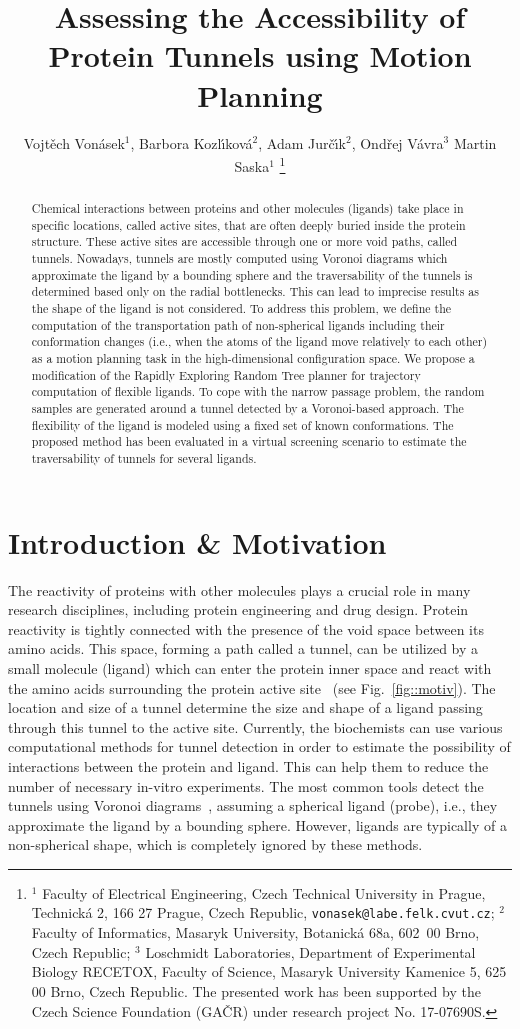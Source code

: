\documentclass[usletter, 10pt, conference]{ieeeconf} %
\title{Assessing the Accessibility of Protein Tunnels using Motion Planning}
\author{Vojt\v ech Von\' asek$^{1}$,
    Barbora Kozl\'\i kov\'a$^{2}$,
    Adam Jur\v{c}\'\i k$^{2}$,
    Ond\v{r}ej V\'{a}vra$^{3}$
    Martin Saska$^{1}$
\thanks{$^{1}$ Faculty of Electrical Engineering,  Czech Technical University in Prague, 
Technick\'a 2, 166 27 Prague, Czech Republic, {\tt vonasek@labe.felk.cvut.cz};
$^{2}$ Faculty of Informatics, Masaryk University, Botanick\'a 68a, 602~00 Brno, Czech Republic;
$^{3}$ Loschmidt Laboratories, Department of Experimental Biology RECETOX, Faculty of Science, Masaryk University
    Kamenice 5, 625 00 Brno, Czech Republic. 
The presented work has been supported by the Czech Science Foundation (GA{\v C}R) under research project No. 17-07690S.
}}
\begin{document}
\maketitle
\thispagestyle{empty}
\pagestyle{empty}

\begin{abstract}
Chemical interactions between proteins and other molecules (ligands) take place in specific locations, called active sites, that are often deeply buried inside the protein structure.
These active sites are accessible through one or more void paths, called tunnels.
Nowadays, tunnels are mostly computed using Voronoi diagrams which approximate the ligand by a bounding sphere and 
the traversability of the tunnels is determined based only on the radial bottlenecks.
This can lead to imprecise results as the shape of the ligand is not considered.
To address this problem, we define the computation of the transportation path of non-spherical ligands including their conformation changes (i.e., when the atoms of the ligand move relatively to each other) as a motion planning task in the high-dimensional configuration space.
We propose a modification of the Rapidly Exploring Random Tree planner for trajectory computation of flexible ligands.
To cope with the narrow passage problem, the random samples are generated around a tunnel detected by a Voronoi-based approach.
The flexibility of the ligand is modeled using a fixed set of known conformations. 
The proposed method has been evaluated in a virtual screening scenario to estimate the traversability of tunnels for several ligands.
\end{abstract}


\section{Introduction \& Motivation}


The reactivity of proteins with other molecules plays a crucial role in many research disciplines, including protein engineering and drug design.
Protein reactivity is tightly connected with the presence of the void space between its amino acids. 
This space, forming a path called a tunnel, can be utilized by a small molecule (ligand) which can enter the protein inner space and react with the amino acids surrounding the protein active site~\cite{gora2013gates,marques2017enzyme} (see Fig.~\ref{fig::motiv}).
The location and size of a tunnel determine the size and shape of a ligand passing through this tunnel to the active site.
Currently, the biochemists can use various computational methods for tunnel detection in order to estimate the possibility of interactions between the protein and ligand.
This can help them to reduce the number of necessary in-vitro experiments.
The most common tools detect the tunnels using Voronoi diagrams~\cite{yaffe2008,caver3}, assuming a spherical ligand (probe), 
i.e., they approximate the ligand by a bounding sphere.
However, ligands are typically of a non-spherical shape, which is completely ignored by these methods. 
\end{document}
